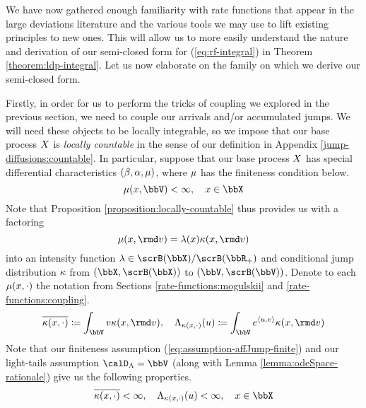 We have now gathered enough familiarity with rate functions that appear in the large deviations literature and the various tools we may use to lift existing principles to new ones.
This will allow us to more easily understand the nature and derivation of our semi-closed form for (\ref{eq:rf-integral}) in Theorem \ref{theorem:ldp-integral}.
Let us now elaborate on the family on which we derive our semi-closed form.

Firstly, in order for us to perform the tricks of coupling we explored in the previous section, we need to couple our arrivals and/or accumulated jumps.
We will need these objects to be locally integrable, so we impose that our base process $X$ is \emph{locally countable} in the sense of our definition in Appendix \ref{jump-diffusions:countable}.
In particular, suppose that our base process $X$ has special differential characteristics $(\beta, \alpha, \mu)$, where $\mu$ has the finiteness condition below.
\begin{equation}
  \label{eq:assumption-affJump-finite}
  \affJump(\stateVar, \vecSpace) < \infty, \quad \stateVar \in \stateSpace
\end{equation}
Note that Proposition \ref{proposition:locally-countable} thus provides us with a factoring 
\begin{equation}
  \label{eq:affJump-factoring}
  \affJump(\stateVar,\rmd\markVar) = \affInt(\stateVar) \affDist(\stateVar, \rmd\markVar)
\end{equation}
into an intensity function $\affInt \in \scrB(\stateSpace)/\scrB(\bbR_+)$ and conditional jump distribution $\kappa$ from $(\stateSpace, \scrB(\stateSpace))$ to $(\vecSpace, \scrB(\vecSpace))$.
Denote to each $\mu(x, \cdot)$ the notation from Sections \ref{rate-functions:mogulskii} and \ref{rate-functions:coupling}.
\begin{equation*}
  \overline{\affDist(\stateVar, \cdot)} \defeq \int_\vecSpace \markVar \affDist(\stateVar, \rmd\markVar), \quad
  \ode_{\affDist(\stateVar,\cdot)}(\momentVar) \defeq \int_\vecSpace e^\prj{\momentVar}{\markVar} \affDist(\stateVar, \rmd\markVar)
\end{equation*}
Note that our finiteness assumption (\ref{eq:assumption-affJump-finite}) and our light-tails assumption $\odeSpace = \vecSpace$ (along with Lemma \ref{lemma:odeSpace-rationale}) give us the following properties.
\begin{equation*}
  \overline{\affDist(\stateVar, \cdot)} < \infty, \quad \ode_{\affDist(\stateVar, \cdot)}(\momentVar) < \infty, \quad \stateVar \in \stateSpace
\end{equation*}
